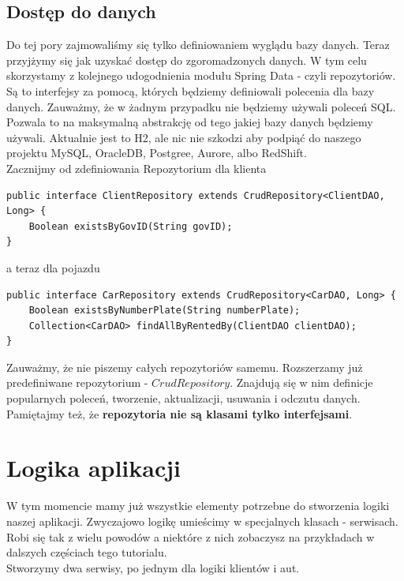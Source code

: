 \documentclass{article}
\begin{document}
        \subsection{Dostęp do danych}
            Do tej pory zajmowaliśmy się tylko definiowaniem wyglądu bazy danych. Teraz przyjżymy się jak uzyskać dostęp do zgoromadzonych danych. W tym celu skorzystamy z kolejnego udogodnienia modułu Spring Data - czyli repozytoriów. \\
            Są to interfejsy za pomocą, których będziemy definiowali polecenia dla bazy danych. Zauważmy, że w żadnym przypadku nie będziemy używali poleceń SQL. Pozwala to na maksymalną abstrakcję od tego jakiej bazy danych będziemy używali. Aktualnie jest to H2, ale nic nie szkodzi aby podpiąć do naszego projektu MySQL, OracleDB, Postgree, Aurore, albo RedShift.\\
            Zacznijmy od zdefiniowania Repozytorium dla klienta
            \begin{verbatim}
public interface ClientRepository extends CrudRepository<ClientDAO, Long> {
    Boolean existsByGovID(String govID);
}
            \end{verbatim}
            a teraz dla pojazdu
            \begin{verbatim}
public interface CarRepository extends CrudRepository<CarDAO, Long> {
    Boolean existsByNumberPlate(String numberPlate);
    Collection<CarDAO> findAllByRentedBy(ClientDAO clientDAO);
}
            \end{verbatim}
            Zauważmy, że nie piszemy całych repozytoriów samemu. Rozszerzamy już predefiniwane repozytorium - $CrudRepository$. Znajdują się w nim definicje popularnych poleceń, tworzenie, aktualizacji, usuwania i odczutu danych. Pamiętajmy też, że \textbf{repozytoria nie są klasami tylko interfejsami}. \\
    \section{Logika aplikacji}
        W tym momencie mamy już wszystkie elementy potrzebne do stworzenia logiki naszej aplikacji. Zwyczajowo logikę umieścimy w specjalnych klasach - serwisach. Robi się tak z wielu powodów a niektóre z nich zobaczysz na przykładach w dalszych częściach tego tutorialu. \\
        Stworzymy dwa serwisy, po jednym dla logiki klientów i aut. 
\end{document}
